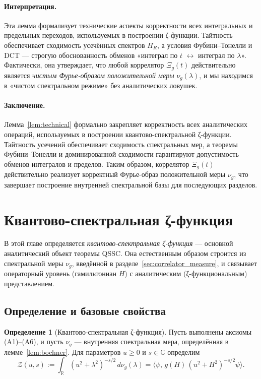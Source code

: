\documentclass{article}
\numberwithin{equation}{section}
\theoremstyle{plain}
\theoremstyle{definition}
\newtheorem{definition}{Определение}
\theoremstyle{remark}
\def\leftrightarrow{↔}%
\begin{document}
\paragraph{Интерпретация.}
Эта лемма формализует технические аспекты корректности всех интегральных и предельных переходов, используемых в построении ζ-функции.  
Тайтность обеспечивает сходимость усечённых спектров $H_R$, а условия Фубини–Тонелли и DCT — строгую обоснованность обменов «интеграл по $t$ $\leftrightarrow$ интеграл по $\lambda$».  
Фактически, она утверждает, что любой коррелятор $\Xi_g(t)$ действительно является \emph{чистым Фурье-образом положительной меры} $\nu_g(\lambda)$, и мы находимся в «чистом спектральном режиме» без аналитических ловушек.

\paragraph{Заключение.}
Лемма~\ref{lem:technical} формально закрепляет корректность всех аналитических операций, используемых в построении квантово-спектральной ζ-функции.  
Тайтность усечений обеспечивает сходимость спектральных мер, а теоремы Фубини–Тонелли и доминированной сходимости гарантируют допустимость обменов интегралов и пределов.  
Таким образом, коррелятор $\Xi_g(t)$ действительно реализует корректный Фурье-образ положительной меры $\nu_g$, что завершает построение внутренней спектральной базы для последующих разделов.

\clearpage

\section{Квантово-спектральная ζ-функция}
\label{sec:qszeta}

\noindent
В этой главе определяется \emph{квантово-спектральная ζ-функция} — основной аналитический объект теоремы QSSC.  
Она естественным образом строится из спектральной меры $\nu_g$, введённой в разделе~\ref{sec:correlator_measure}, и связывает операторный уровень (гамильтониан $H$) с аналитическим (ζ-функциональным) представлением.

\subsection{Определение и базовые свойства}
\label{subsec:definition}

\begin{definition}[Квантово-спектральная ζ-функция]
\label{def:qszeta}
Пусть выполнены аксиомы (A1)–(A6), и пусть $\nu_g$ — внутренняя спектральная мера, определённая в лемме~\ref{lem:bochner}.  
Для параметров $u\ge0$ и $s\in\mathbb C$ определим
\begin{equation}
\label{eq:qszeta}
\mathcal Z(u,s)
:=\int_{\mathbb R}(u^2+\lambda^2)^{-s/2}\,d\nu_g(\lambda)
=\big\langle \psi,\,g(H)\,(u^2+H^2)^{-s/2}\psi\big\rangle.
\end{equation}
\end{definition}
\end{document}
